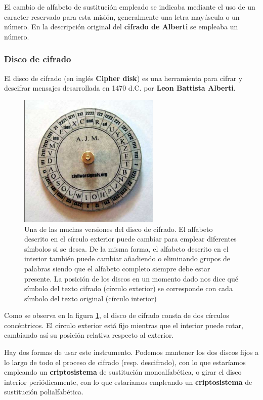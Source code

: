 \documentclass[nochap]{apuntesURJC}
\begin{document}
El cambio de alfabeto de sustitución empleado se indicaba mediante el uso de un caracter reservado para esta misión, generalmente una letra mayúscula o un número. En la descripción original del \textbf{cifrado de Alberti} se empleaba un número.

\subsubsection{Disco de cifrado}
El disco de cifrado (en inglés \textbf{Cipher disk}) es una herramienta para cifrar y descifrar mensajes desarrollada en 1470 d.C. por \textbf{Leon Battista Alberti}.

\begin{figure}[hbtp]
\centering
\includegraphics[width=0.6\textwidth]{img/cipher_disk.png}
\caption{Una de las muchas versiones del disco de cifrado. El alfabeto descrito en el círculo exterior puede cambiar para emplear diferentes símbolos si se desea. De la misma forma, el alfabeto descrito en el interior también puede cambiar añadiendo o eliminando grupos de palabras siendo que el alfabeto completo siempre debe estar presente. La posición de los discos en un momento dado nos dice qué símbolo del texto cifrado (círculo exterior) se corresponde con cada símbolo del texto original (círculo interior)}
\label{fig:cipher_disk}
\end{figure}

Como se observa en la figura \ref{fig:cipher_disk}, el disco de cifrado consta de dos círculos concéntricos. El círculo exterior está fijo mientras que el interior puede rotar, cambiando así su posición relativa respecto al exterior.

Hay dos formas de usar este instrumento. Podemos mantener los dos discos fijos a lo largo de todo el proceso de cifrado (resp. descifrado), con lo que estaríamos empleando un \textbf{criptosistema} de sustitución monoalfabética, o girar el disco interior periódicamente, con lo que estaríamos empleando un \textbf{criptosistema} de sustitución polialfabética.
\end{document}
